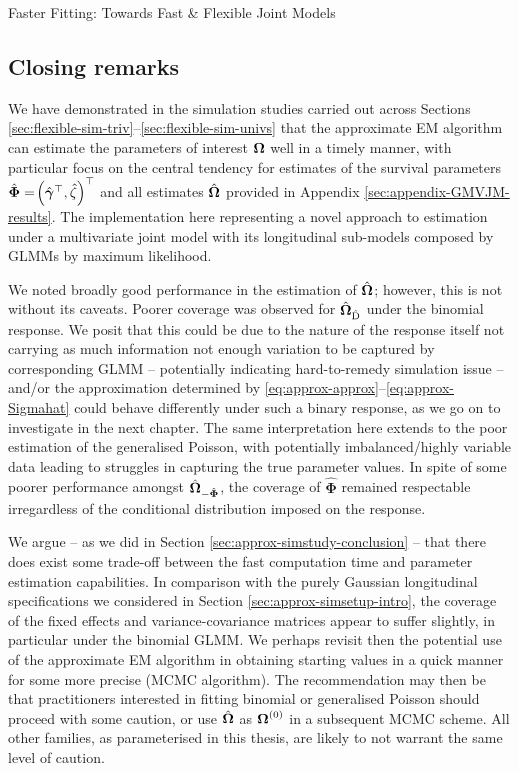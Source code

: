 \begin{chapter}{\label{cha:flexible}Faster Fitting: Towards Fast \& Flexible Joint Models}
\subsection{Closing remarks}\label{sec:flexible-simstudy-conclusion}
We have demonstrated in the simulation studies carried out across Sections \ref{sec:flexible-sim-triv}--\ref{sec:flexible-sim-univs} that the approximate EM algorithm can estimate the parameters of interest $\bm{\mathrm{\Omega}}$ well in a timely manner, with particular focus on the central tendency for estimates of the survival parameters $\hat{\bm{\Phi}}=\!\left(\hat{\bm{\gamma}}^\top,\hat{\zeta}\right)^\top$ and all estimates $\hat{\bm{\Omega}}$ provided in Appendix \ref{sec:appendix-GMVJM-results}. The implementation here representing a novel approach to estimation under a multivariate joint model with its longitudinal sub-models composed by GLMMs by maximum likelihood.

We noted broadly good performance in the estimation of $\hat{\bm{\Omega}}$; however, this is not without its caveats. Poorer coverage was observed for $\hat{\bm{\Omega}}_{\hat{\mathrm{D}}}$ under the binomial response. We posit that this could be due to the nature of the response itself not carrying as much information \ie not enough variation to be captured by corresponding GLMM -- potentially indicating hard-to-remedy simulation issue -- and/or the approximation determined by \eqref{eq:approx-approx}--\eqref{eq:approx-Sigmahat} could behave differently under such a binary response, as we go on to investigate in the next chapter. The same interpretation here extends to the poor estimation of the generalised Poisson, with potentially imbalanced/highly variable data leading to struggles in capturing the true parameter values.\newline
In spite of some poorer performance amongst $\hat{\bm{\Omega}}_{-\hat{\bm{\Phi}}}$, the coverage of $\hat{\bm{\Phi}}$ remained respectable irregardless of the conditional distribution imposed on the response. 

We argue -- as we did in Section \ref{sec:approx-simstudy-conclusion} -- that there does exist some trade-off between the fast computation time and parameter estimation capabilities. In comparison with the purely Gaussian longitudinal specifications we considered in Section \ref{sec:approx-simsetup-intro}, the coverage of the fixed effects and variance-covariance matrices appear to suffer slightly, in particular under the binomial GLMM.\newline
We perhaps revisit then the potential use of the approximate EM algorithm in obtaining starting values in a quick manner for some more precise (\eg MCMC algorithm). The recommendation may then be that practitioners interested in fitting binomial or generalised Poisson should proceed with some caution, or use $\hat{\bm{\Omega}}$ as $\bm{\mathrm{\Omega}}^{(0)}$ in a subsequent MCMC scheme. All other families, as parameterised in this thesis, are likely to not warrant the same level of caution.


\end{chapter}
